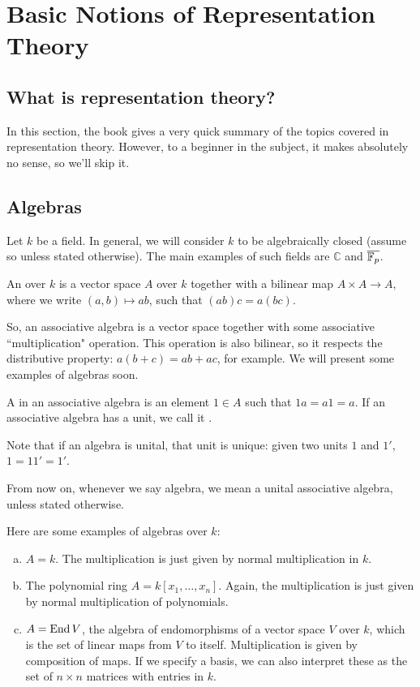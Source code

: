 \chapter{Basic Notions of Representation Theory}

\section{What is representation theory?}

In this section, the book gives a very quick summary of the topics covered in representation theory. However, to a beginner in the subject, it makes absolutely no sense, so we'll skip it.

\section{Algebras}

Let $k$ be a field. In general, we will consider $k$ to be algebraically closed (assume so unless stated otherwise). The main examples of such fields are $\mathbb{C}$ and $\overline{\mathbb{F}_p}$. 

\begin{definition}
An  over $k$ is a vector space $A$ over $k$ together with a bilinear map $A\times A\to A$, where we write $(a,b)\mapsto ab$, such that $(ab)c=a(bc)$.
\end{definition}

So, an associative algebra is a vector space together with some associative ``multiplication" operation. This operation is also bilinear, so it respects the distributive property: $a(b+c)=ab+ac$, for example. We will present some examples of algebras soon.

\begin{definition}
A  in an associative algebra is an element $1\in A$ such that $1a=a1=a$. If an associative algebra has a unit, we call it .
\end{definition}

Note that if an algebra is unital, that unit is unique: given two units $1$ and $1'$, $1=11'=1'$. 

From now on, whenever we say algebra, we mean a unital associative algebra, unless stated otherwise.

\begin{example}[Algebras]
Here are some examples of algebras over $k$:
\begin{enumerate}[(a)]
    \item $A=k$. The multiplication is just given by normal multiplication in $k$.
    \item The polynomial ring $A=k[x_1,\dots,x_n]$. Again, the multiplication is just given by normal multiplication of polynomials.
    \item $A=\operatorname{End} V$, the algebra of endomorphisms of a vector space $V$ over $k$, which is the set of linear maps from $V$ to itself. Multiplication is given by composition of maps. If we specify a basis, we can also interpret these as the set of $n\times n$ matrices with entries in $k$.
\end{enumerate}
\end{example}

